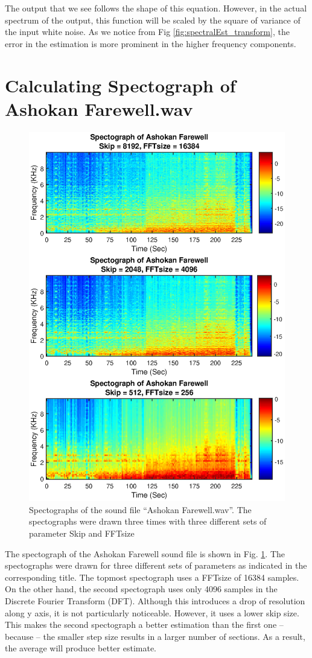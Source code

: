 \documentclass[12pt]{article}
\begin{document}
The output that we see follows the shape of this equation. However, in the actual spectrum of the output, this function will be scaled by the square of variance of the input white noise. As we notice from Fig \ref{fig:spectralEst_transform}, the error in the estimation is more prominent in the higher frequency components.

\section{Calculating Spectograph of Ashokan Farewell.wav}
\begin{figure}
    \centering
    \includegraphics[width=1.07\textwidth]{spectra}
    \caption{Spectographs of the sound file ``Ashokan Farewell.wav''. The spectographs were drawn three times with three different sets of parameter Skip and FFTsize}
    \label{fig:spectra}
\end{figure}
The spectograph of the Ashokan Farewell sound file is shown in Fig. \ref{fig:spectra}. The spectographs were drawn for three different sets of parameters as indicated in the corresponding title. The topmost spectograph uses a FFTsize of 16384 samples. On the other hand, the second spectograph uses only 4096 samples in the Discrete Fourier Transform (DFT). Although this introduces a drop of resolution along y axis, it is not particularly noticeable. However, it uses a lower skip size. This makes the second spectograph a better estimation than the first one -- because -- the smaller step size results in a larger number of sections. As a result, the average will produce better estimate.
\end{document}
